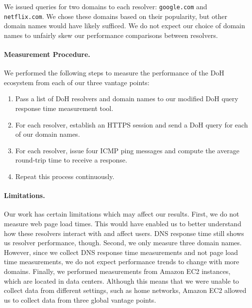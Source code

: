 We issued queries for two domains to each resolver: \texttt{google.com} and
\texttt{netflix.com}.  We chose these domains based on their popularity, but
other domain names would have likely sufficed.  We do not expect our choice of
domain names to unfairly skew our performance comparisons between resolvers.

\paragraph{Measurement Procedure.} We performed the following steps to measure
the performance of the DoH ecosystem from each of our three vantage points:
\begin{enumerate} \item Pass a list of DoH resolvers and domain names to our
            modified DoH query response time measurement tool.  \item For each
            resolver, establish an HTTPS session and send a DoH query for each
        of our domain names.  \item For each resolver, issue four ICMP ping
            messages and compute the average round-trip time to receive a
            response.  \item Repeat this process continuously.
\end{enumerate}

\paragraph{Limitations.} Our work has certain limitations which may affect our
results.  First, we do not measure web page load times.  This would have
enabled us to better understand how these resolvers interact with and affect
users.  DNS response time still shows us resolver performance, though.
Second, we only measure three domain names.  However, since we collect DNS
response time measurements and not page load time measurements, we do not
expect performance trends to change with more domains.  Finally, we performed
measurements from Amazon EC2 instances, which are located in data centers.
Although this means that we were unable to collect data from different
settings, such as home networks, Amazon EC2 allowed us to collect data from
three global vantage points. 
